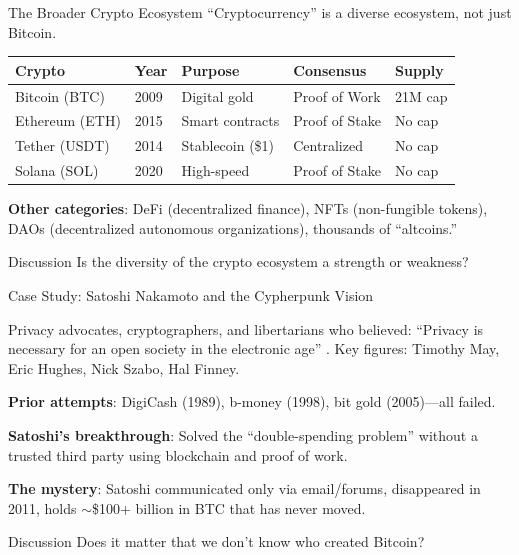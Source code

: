 ﻿\documentclass[aspectratio=169,11pt]{beamer}
\begin{document}
\begin{frame}{The Broader Crypto Ecosystem}
``Cryptocurrency'' is a diverse ecosystem, not just Bitcoin.

\vspace{0.3em}
\begin{table}[h]
\centering
\footnotesize
\begin{tabular}{@{}lllll@{}}
\toprule
\textbf{Crypto} & \textbf{Year} & \textbf{Purpose} & \textbf{Consensus} & \textbf{Supply} \\
\midrule
Bitcoin (BTC) & 2009 & Digital gold & Proof of Work & 21M cap \\
Ethereum (ETH) & 2015 & Smart contracts & Proof of Stake & No cap \\
Tether (USDT) & 2014 & Stablecoin (\$1) & Centralized & No cap \\
Solana (SOL) & 2020 & High-speed & Proof of Stake & No cap \\
\bottomrule
\end{tabular}
\end{table}

\vspace{0.3em}
\textbf{Other categories}: DeFi (decentralized finance), NFTs (non-fungible tokens), DAOs (decentralized autonomous organizations), thousands of ``altcoins.''

\begin{alertblock}{Discussion}
Is the diversity of the crypto ecosystem a strength or weakness?
\end{alertblock}
\end{frame}

\begin{frame}{Case Study: Satoshi Nakamoto and the Cypherpunk Vision}
\begin{casestudybox}
Privacy advocates, cryptographers, and libertarians who believed: ``Privacy is necessary for an open society in the electronic age'' \parencite{hughes_cypherpunk}. Key figures: Timothy May, Eric Hughes, Nick Szabo, Hal Finney.
\end{casestudybox}

\vspace{0.3em}
\textbf{Prior attempts}: DigiCash (1989), b-money (1998), bit gold (2005)---all failed.

\textbf{Satoshi's breakthrough}: Solved the ``double-spending problem'' without a trusted third party using blockchain and proof of work.

\textbf{The mystery}: Satoshi communicated only via email/forums, disappeared in 2011, holds $\sim$\$100+ billion in BTC that has never moved.

\begin{alertblock}{Discussion}
Does it matter that we don't know who created Bitcoin?
\end{alertblock}
\end{frame}
\end{document}
